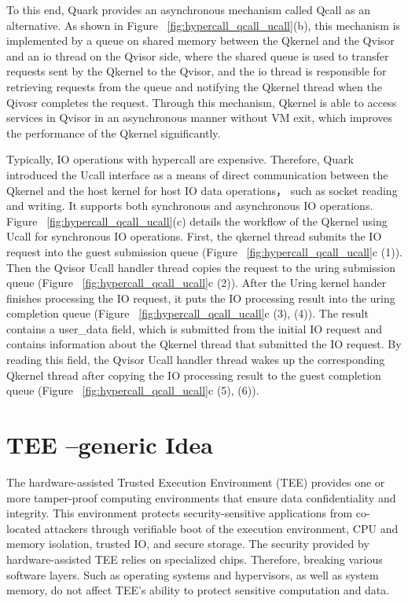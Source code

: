 To this end, Quark provides an asynchronous mechanism called Qcall as an alternative. 
As shown in Figure ~\ref{fig:hypercall_qcall_ucall}(b), this mechanism is implemented by a queue on shared memory between the Qkernel and the Qvisor and an io thread on the Qvisor side, where the
shared queue is used to transfer requests sent by the Qkernel to the Qvisor, and the io thread is responsible for retrieving requests from the queue and notifying the Qkernel thread when the Qivosr completes 
the request. Through this mechanism, Qkernel is able to access services in Qvisor in an asynchronous manner without VM exit, which improves the performance of the Qkernel significantly.

Typically, IO operations with hypercall are expensive. Therefore, Quark introduced the Ucall interface as a means of direct communication between the Qkernel and the host kernel for host 
IO data operations，  such as socket reading and writing. It supports both synchronous and asynchronous IO operations. Figure ~\ref{fig:hypercall_qcall_ucall}(c) details the workflow of the Qkernel 
using Ucall for synchronous IO operations. First, the qkernel thread submits the IO request into the guest submission queue (Figure ~\ref{fig:hypercall_qcall_ucall}c (1)). Then the Qvisor Ucall handler thread copies the request to the uring submission 
queue (Figure ~\ref{fig:hypercall_qcall_ucall}c (2)). After the Uring kernel hander finishes processing the IO request, it puts the IO processing result into the uring completion queue (Figure ~\ref{fig:hypercall_qcall_ucall}c (3), (4)). The result 
contains a user\_data field, which is submitted from the initial IO request and contains information about the Qkernel thread that submitted the IO request. By reading this field, the Qvisor Ucall handler thread wakes up the corresponding Qkernel thread 
after copying the IO processing result to the guest completion queue (Figure ~\ref{fig:hypercall_qcall_ucall}c (5), (6)).



\section{TEE --generic Idea}
The hardware-assisted Trusted Execution Environment (TEE) provides one or more tamper-proof computing environments that ensure data confidentiality and integrity. This environment protects security-sensitive applications from co-located attackers 
through verifiable boot of the execution environment, CPU and memory isolation, trusted IO, and secure storage\cite*{Hardware-supported-TEE}. The security provided by hardware-assisted TEE relies on specialized chips. Therefore, breaking various software layers.
Such as operating systems and hypervisors, as well as system memory, do not affect TEE's ability to protect sensitive computation and data\cite*{7345265}.

